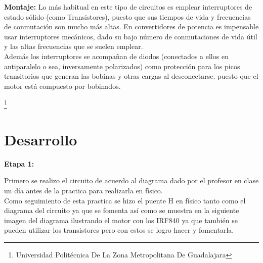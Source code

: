 \documentclass[10pt,a4paper]{article}
\begin{document}
\textbf{Montaje:}
Lo más habitual en este tipo de circuitos es emplear interruptores de estado sólido (como Transistores), puesto que sus tiempos de vida y frecuencias de conmutación son mucho más altas. En convertidores de potencia es impensable usar interruptores mecánicos, dado su bajo número de conmutaciones de vida útil y las altas frecuencias que se suelen emplear.\\
Además los interruptores se acompañan de diodos (conectados a ellos en antiparalelo o sea, inversamente polarizados) como protección para los picos transitorios que generan las bobinas y otras cargas al desconectarse. puesto que el motor está compuesto por bobinados.

\footnote{Universidad Politécnica De La Zona Metropolitana De Guadalajara} 

\newpage

\section{Desarrollo}

\textbf{Etapa 1:}

Primero se realizo el circuito de acuerdo al diagrama dado por el profesor en clase un día antes de la practica para realizarla en físico. \\

Como seguimiento de esta practica se hizo el puente H en físico tanto como el diagrama del circuito ya que se fomenta así como se muestra en la siguiente imagen del diagrama ilustrando el motor con los IRF840 ya que también se pueden utilizar los transistores pero con estos se logro hacer y fomentarla.\\
\end{document}

